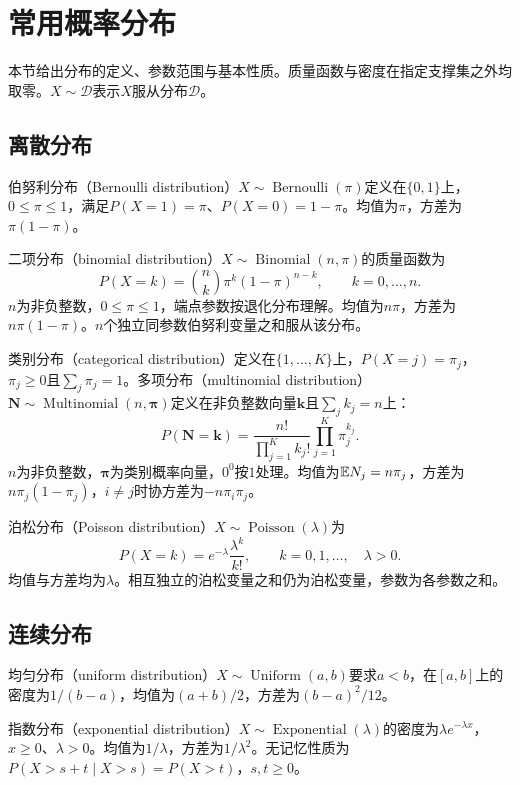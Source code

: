 \section{常用概率分布}
本节给出分布的定义、参数范围与基本性质。质量函数与密度在指定支撑集之外均取零。$X\sim\mathcal D$表示$X$服从分布$\mathcal D$。

\subsection{离散分布}
伯努利分布（Bernoulli distribution）$X\sim\operatorname{Bernoulli}(\pi)$定义在$\{0,1\}$上，$0\leq\pi\leq1$，满足$P(X=1)=\pi$、$P(X=0)=1-\pi$。均值为$\pi$，方差为$\pi(1-\pi)$。

二项分布（binomial distribution）$X\sim\operatorname{Binomial}(n,\pi)$的质量函数为
\begin{equation}
 P(X=k)=\binom nk\pi^k(1-\pi)^{n-k},\qquad k=0,\ldots,n.
\end{equation}
$n$为非负整数，$0\leq\pi\leq1$，端点参数按退化分布理解。均值为$n\pi$，方差为$n\pi(1-\pi)$。$n$个独立同参数伯努利变量之和服从该分布。

类别分布（categorical distribution）定义在$\{1,\ldots,K\}$上，$P(X=j)=\pi_j$，$\pi_j\geq0$且$\sum_j\pi_j=1$。多项分布（multinomial distribution）$\bm N\sim\operatorname{Multinomial}(n,\bm\pi)$定义在非负整数向量$\bm k$且$\sum_jk_j=n$上：
\begin{equation}
 P(\bm N=\bm k)=\frac{n!}{\prod_{j=1}^Kk_j!}\prod_{j=1}^K\pi_j^{k_j}.
\end{equation}
$n$为非负整数，$\bm\pi$为类别概率向量，$0^0$按$1$处理。均值为$\mathbb{E} N_j=n\pi_j$，方差为$n\pi_j(1-\pi_j)$，$i\ne j$时协方差为$-n\pi_i\pi_j$。

泊松分布（Poisson distribution）$X\sim\operatorname{Poisson}(\lambda)$为
\begin{equation}
 P(X=k)=e^{-\lambda}\frac{\lambda^k}{k!},\qquad k=0,1,\ldots,\quad\lambda>0.
\end{equation}
均值与方差均为$\lambda$。相互独立的泊松变量之和仍为泊松变量，参数为各参数之和。

\subsection{连续分布}
均匀分布（uniform distribution）$X\sim\operatorname{Uniform}(a,b)$要求$a<b$，在$[a,b]$上的密度为$1/(b-a)$，均值为$(a+b)/2$，方差为$(b-a)^2/12$。

指数分布（exponential distribution）$X\sim\operatorname{Exponential}(\lambda)$的密度为$\lambda e^{-\lambda x}$，$x\geq0$、$\lambda>0$。均值为$1/\lambda$，方差为$1/\lambda^2$。无记忆性质为$P(X>s+t\mid X>s)=P(X>t)$，$s,t\geq0$。

